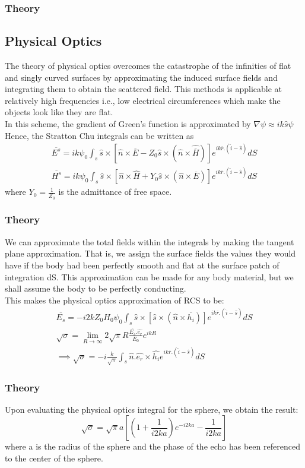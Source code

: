 \documentclass{beamer}
\begin{document}
\begin{frame}
\frametitle{Theory}
\subsection{Physical Optics}
The theory of physical optics overcomes the catastrophe of the infinities of flat and singly curved surfaces by approximating the induced surface fields and integrating them to obtain the scattered field. This methods is applicable at relatively high frequencies i.e., low electrical circumferences which make the objects look like they are flat.\\
In this scheme, the gradient of Green's function is approximated by $\nabla \psi \approx ik\hat{s}\psi$ Hence, the Stratton Chu integrals can be written as 
\begin{eqnarray}
\overline{E^s} = ik\psi_0 \int_s \hat{s}\times[\hat{n}\times\overline{E} - Z_0\hat{s}\times(\hat{n}\times\hat{\overline{H}})]e^{ik\overline{r}.(\hat{i} - \hat{s})}dS \\
\overline{H^s} = ik\psi_0 \int_s \hat{s}\times[\hat{n}\times\hat{H} + Y_0\hat{s}\times(\hat{n}\times\overline{E})]e^{ik\overline{r}.(\hat{i}-\hat{s})}dS
\end{eqnarray}
where $ Y_0 = \frac{1}{Z_0}$ is the admittance of free space.\\
\end{frame}
\begin{frame}
\frametitle{Theory}
We can approximate the total fields within the integrals by making the tangent plane approximation. That is, we assign the surface fields the values they would have if the body had been perfectly smooth and flat at the surface patch of integration dS. This approximation can be made for any body material, but we shall assume the body to be perfectly conducting. \\
This makes the physical optics approximation of RCS to be:
\begin{eqnarray}
\overline{E_s} = -i2kZ_0H_0\psi_0 \int_s \hat{s}\times[\hat{s}\times(\hat{n}\times\overline{h_i})]e^{ik\overline{r}.(\hat{i} - \hat{s})}dS \\
\sqrt{\sigma} = \lim_{R\rightarrow\infty} 2\sqrt{\pi}R\frac{\overline{E_s}.\hat{e_r}}{E_0}e^{ikR} \\
\implies \sqrt{\sigma} = -i\frac{k}{\sqrt{\pi}}\int_s \hat{n}.\hat{e_r}\times\hat{h_i}e^{ik\overline{r}.(\hat{i} - \hat{s})}dS
\end{eqnarray}
\end{frame}
\begin{frame}
\frametitle{Theory}
Upon evaluating the physical optics integral for the sphere, we obtain the result:
\begin{equation}
\sqrt{\sigma} = \sqrt{\pi}a[(1 + \frac{1}{i2ka})e^{-i2ka} - \frac{1}{i2ka}]
\end{equation}
where a is the radius of the sphere and the phase of the echo has been referenced to the center of the sphere. 
\end{frame}
\end{document}
